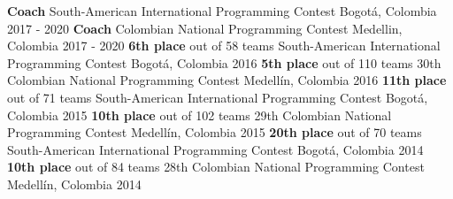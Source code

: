 
\begin{cvhonors}
  \cvhonor
    {\textbf{Coach}}
    {South-American International Programming Contest}
    {Bogotá, Colombia}
    {2017 - 2020}
  \cvhonor
    {\textbf{Coach}}
    {Colombian National Programming Contest}
    {Medellin, Colombia}
    {2017 - 2020}
  \cvhonor
    {\textbf{6th place} out of 58 teams}
    {South-American International Programming Contest}
    {Bogotá, Colombia}
    {2016}
  \cvhonor
    {\textbf{5th place} out of 110 teams}
    {30th Colombian National Programming Contest}
    {Medellín, Colombia}
    {2016}
  \cvhonor
    {\textbf{11th place} out of 71 teams}
    {South-American International Programming Contest}
    {Bogotá, Colombia}
    {2015}
  \cvhonor
    {\textbf{10th place} out of 102 teams}
    {29th Colombian National Programming Contest}
    {Medellín, Colombia}
    {2015}
  \cvhonor
    {\textbf{20th place} out of 70 teams}
    {South-American International Programming Contest}
    {Bogotá, Colombia}
    {2014}
  \cvhonor
    {\textbf{10th place} out of 84 teams}
    {28th Colombian National Programming Contest}
    {Medellín, Colombia}
    {2014}
\end{cvhonors}
